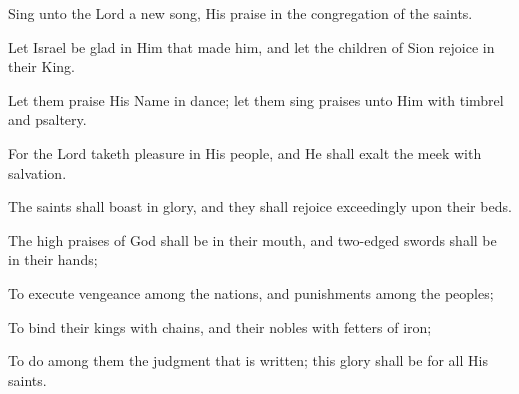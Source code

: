Sing unto the Lord a new song, His praise in the congregation of the saints.

Let Israel be glad in Him that made him, and let the children of Sion rejoice in their King.

Let them praise His Name in dance; let them sing praises unto Him with timbrel and psaltery.

For the Lord taketh pleasure in His people, and He shall exalt the meek with salvation.

The saints shall boast in glory, and they shall rejoice exceedingly upon their beds.

The high praises of God shall be in their mouth, and two-edged swords shall be in their hands;

To execute vengeance among the nations, and punishments among the peoples;

To bind their kings with chains, and their nobles with fetters of iron;

To do among them the judgment that is written; this glory shall be for all His saints.

